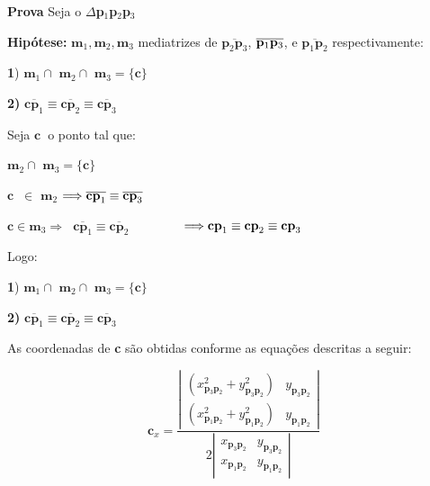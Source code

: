 \documentclass[12pt,a4paper]{book}
\begin{document}
{\bf Prova}
 Seja o $\Delta $\textbf{p}$_{1}$\textbf{p}$_{2}$\textbf{p}$_{3}$

\textbf{Hip\'{o}tese: }$\mathbf{m}_{1},\mathbf{m}_{2},\mathbf{m}_{3}$
mediatrizes de $\overline{\mathbf{p}_{2}\mathbf{p}_{3}}$, $\overline{\mathbf{%
p}_{1}\mathbf{p}_{3}}$, e $\overline{\mathbf{p}_{1}\mathbf{p}_{2}}$
respectivamente:

\textbf{1}) $\mathbf{m}_{1}\cap $ $\mathbf{m}_{2}\cap $ $\mathbf{m}_{3}=\{%
\mathbf{c}\}$

\textbf{2) }$\overline{\mathbf{cp}_{1}}\equiv \overline{\mathbf{cp}_{2}}%
\equiv \overline{\mathbf{cp}_{3}}$

Seja $\mathbf{c}$\textbf{\ }o ponto tal que:

$\mathbf{m}_{2}\cap $ $\mathbf{m}_{3}=\{\mathbf{c}\}$

$\mathbf{c}$\textbf{\ }$\in $ $\mathbf{m}_{2}$ $\Longrightarrow \overline{%
\mathbf{cp}_{1}}\equiv \overline{\mathbf{cp}_{3}}$

$\mathbf{c\in m}_{3}\Longrightarrow $\textbf{\ }$\overline{\mathbf{cp}_{1}}%
\equiv \overline{\mathbf{cp}_{2}}$ \ \ \ \ \ \ \ \ $\Longrightarrow \mathbf{%
cp}_{1}\equiv \mathbf{cp}_{2}\equiv \mathbf{cp}_{3}$

 Logo:

\textbf{1}) $\mathbf{m}_{1}\cap $ $\mathbf{m}_{2}\cap $ $\mathbf{m}_{3}=\{%
\mathbf{c}\}$

\textbf{2) }$\overline{\mathbf{cp}_{1}}\equiv \overline{\mathbf{cp}_{2}}%
\equiv \overline{\mathbf{cp}_{3}}$



As coordenadas de \textbf{c} s\~{a}o obtidas conforme as equa\c{c}\~{o}es
descritas a seguir:



\begin{equation}
\mathbf{c}_{x}=\frac{\left\vert 
\begin{array}{cc}
(x_{\mathbf{p}_{3}\mathbf{p}_{2}}^{2}+y_{\mathbf{p}_{3}\mathbf{p}_{2}}^{2})
& y_{\mathbf{p}_{3}\mathbf{p}_{2}} \\ 
(x_{\mathbf{p}_{1}\mathbf{p}_{2}}^{2}+y_{\mathbf{p}_{1}\mathbf{p}_{2}}^{2})
& y_{\mathbf{p}_{1}\mathbf{p}_{2}}%
\end{array}%
\right\vert }{2\left\vert 
\begin{array}{cc}
x_{\mathbf{p}_{3}\mathbf{p}_{2}} & y_{\mathbf{p}_{3}\mathbf{p}_{2}} \\ 
x_{\mathbf{p}_{1}\mathbf{p}_{2}} & y_{\mathbf{p}_{1}\mathbf{p}_{2}}%
\end{array}%
\right\vert }
\end{equation}%
\end{document}
